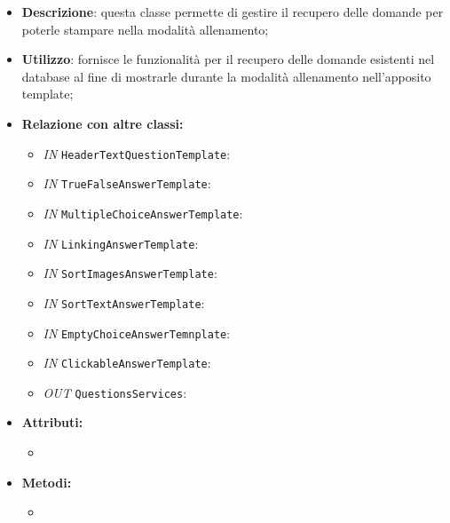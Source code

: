 \begin{itemize}
	\item \textbf{Descrizione}: questa classe permette di gestire il recupero delle domande per poterle stampare nella modalità allenamento;
	\item \textbf{Utilizzo}: fornisce le funzionalità per il recupero delle domande esistenti nel database al fine di mostrarle durante la modalità allenamento nell'apposito template;
	\item \textbf{Relazione con altre classi:}
	\begin{itemize}
		\item \textit{IN} \texttt{HeaderTextQuestionTemplate}:  
		\item \textit{IN} \texttt{TrueFalseAnswerTemplate}:  
		\item \textit{IN} \texttt{MultipleChoiceAnswerTemplate}:  
		\item \textit{IN} \texttt{LinkingAnswerTemplate}:  
		\item \textit{IN} \texttt{SortImagesAnswerTemplate}:  
		\item \textit{IN} \texttt{SortTextAnswerTemplate}:  
		\item \textit{IN} \texttt{EmptyChoiceAnswerTemnplate}:  
		\item \textit{IN} \texttt{ClickableAnswerTemplate}:  
		\item \textit{OUT} \texttt{QuestionsServices}: 
	\end{itemize}
	\item \textbf{Attributi:}
	\begin{itemize}
		\item 
	\end{itemize}
	\item \textbf{Metodi:}
	\begin{itemize}
		\item 
	\end{itemize}
\end{itemize}

